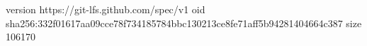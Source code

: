 version https://git-lfs.github.com/spec/v1
oid sha256:332f01617aa09cce78f734185784bbc130213ce8fe71aff5b94281404664c387
size 106170
